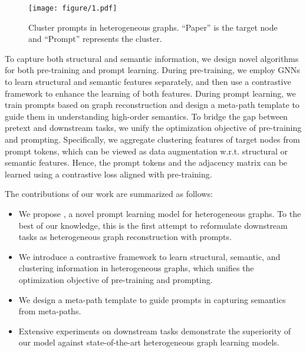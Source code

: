 \begin{figure}[t]
    \centering
    \texttt{[image: figure/1.pdf]}
    \caption{Cluster prompts in heterogeneous graphs. ``Paper'' is the target node and ``Prompt'' represents the cluster.}
    \label{figure::prompt}
    \vspace{-5mm}
\end{figure}

To capture both structural and semantic information, we design novel algorithms for both pre-training and prompt learning. During pre-training, we employ GNNs to learn structural and semantic features separately, and then use a contrastive framework to enhance the learning of both features. During prompt learning, we train prompts based on graph reconstruction and design a meta-path template to guide them in understanding high-order semantics. To bridge the gap between pretext and downstream tasks, we unify the optimization objective of pre-training and prompting. Specifically, we aggregate clustering features of target nodes from prompt tokens, which can be viewed as data augmentation w.r.t. structural or semantic features. Hence, the prompt tokens and the adjacency matrix can be learned using a contrastive loss aligned with pre-training.

The contributions of our work are summarized as follows:

\begin{itemize}
    \item We propose \ourmethod, a novel prompt learning model for heterogeneous graphs. To the best of our knowledge, this is the first attempt to reformulate downstream tasks as heterogeneous graph reconstruction with prompts.
    \item We introduce a contrastive framework to learn structural, semantic, and clustering information in heterogeneous graphs, which unifies the optimization objective of pre-training and prompting.
    \item We design a meta-path template to guide prompts in capturing semantics from meta-paths.
    \item Extensive experiments on downstream tasks demonstrate the superiority of our model against state-of-the-art heterogeneous graph learning models.
\end{itemize}


